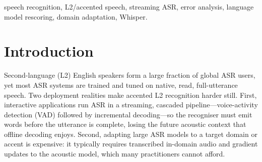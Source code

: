 \documentclass[conference]{IEEEtran}
\begin{document}
\begin{abstract}
\end{abstract}

\begin{IEEEkeywords}
speech recognition, L2/accented speech, streaming ASR, error analysis, language model rescoring, domain adaptation, Whisper.
\end{IEEEkeywords}

\section{Introduction}
Second-language (L2) English speakers form a large fraction of global ASR users, yet most ASR systems are trained and tuned on native, read, full-utterance speech. Two deployment realities make accented L2 recognition harder still. First, interactive applications run ASR in a streaming, cascaded pipeline---voice-activity detection (VAD) followed by incremental decoding---so the recogniser must emit words before the utterance is complete, losing the future acoustic context that offline decoding enjoys. Second, adapting large ASR models to a target domain or accent is expensive: it typically requires transcribed in-domain audio and gradient updates to the acoustic model, which many practitioners cannot afford.
\end{document}
